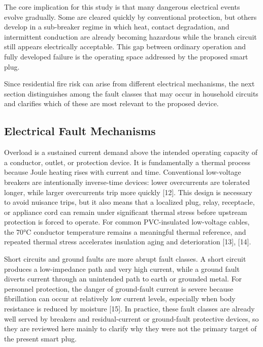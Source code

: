 The core implication for this study is that many dangerous electrical
events evolve gradually. Some are cleared quickly by conventional
protection, but others develop in a sub-breaker regime in which heat,
contact degradation, and intermittent conduction are already becoming
hazardous while the branch circuit still appears electrically
acceptable. This gap between ordinary operation and fully developed
failure is the operating space addressed by the proposed smart plug.

Since residential fire risk can arise from different electrical
mechanisms, the next section distinguishes among the fault classes that
may occur in household circuits and clarifies which of these are most
relevant to the proposed device.

\subsection{Electrical Fault Mechanisms}\label{electrical-fault-mechanisms}

Overload is a sustained current demand above the intended operating
capacity of a conductor, outlet, or protection device. It is
fundamentally a thermal process because Joule heating rises with current
and time. Conventional low-voltage breakers are intentionally
inverse-time devices: lower overcurrents are tolerated longer, while
larger overcurrents trip more quickly {[}12{]}. This design is necessary
to avoid nuisance trips, but it also means that a localized plug, relay,
receptacle, or appliance cord can remain under significant thermal
stress before upstream protection is forced to operate. For common
PVC-insulated low-voltage cables, the 70°C conductor temperature remains
a meaningful thermal reference, and repeated thermal stress accelerates
insulation aging and deterioration {[}13{]}, {[}14{]}.

Short circuits and ground faults are more abrupt fault classes. A short
circuit produces a low-impedance path and very high current, while a
ground fault diverts current through an unintended path to earth or
grounded metal. For personnel protection, the danger of ground-fault
current is severe because fibrillation can occur at relatively low
current levels, especially when body resistance is reduced by moisture
{[}15{]}. In practice, these fault classes are already well served by
breakers and residual-current or ground-fault protective devices, so
they are reviewed here mainly to clarify why they were not the primary
target of the present smart plug.


